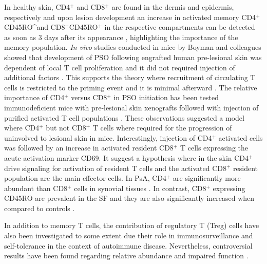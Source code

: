 In healthy skin, CD4$^+$ and CD8$^+$ are found in the dermis and epidermis, respectively \parencite{Clark2006,Perera2012} and upon lesion development an increase in activated memory CD4$^+$CD45RO^and CD8$^+$CD45RO$^+$ in the respective compartments can be detected as soon as 3 days after its appearance \parencite{Clark2006}, highlighting the importance of the memory population. \textit{In vivo} studies conducted in mice by Boyman and colleagues showed that development of PSO following engrafted human pre-lesional skin was dependent of local T cell proliferation and it did not required injection of additional factors \parencite{Boyle2013}. This supports the theory where recruitment of circulating T cells is restricted to the priming event and it is minimal afterward \parencite{Perera2012}. The relative importance of CD4$^+$ versus CD8$^+$ in PSO initiation has been tested immunodeficient mice with pre-lesional skin xenografts followed with injection of purified activated T cell populations \parencite{Nickoloff1999}. These observations suggested a model where CD4$^+$ but not CD8$^+$ T cells where required for the progression of uninvolved to lesional skin in mice. Interestingly, injection of CD4$^+$ activated cells was followed by an increase in activated resident CD8$^+$ T cells expressing the acute activation marker CD69. It suggest a hypothesis where in the skin CD4$^+$ drive signaling for activation of resident T cells and the activated CD8$^+$ resident population are the main effector cells. In PsA, CD4$^+$ are significantly more abundant than CD8$^+$ cells in synovial tissues \parencite{Diani2015}. In contrast, CD8$^+$ expressing CD45RO are prevalent in the SF and they are also significantly increased when compared to controls \parencite{Costello1999}.

In addition to memory T cells, the contribution of regulatory T (Treg) cells have also been investigated to some extent due their role in immunosurveillance and self-tolerance in the context of autoimmune disease. Nevertheless, controversial results have been found regarding relative abundance and impaired function \parencite{Perera2012}. 

